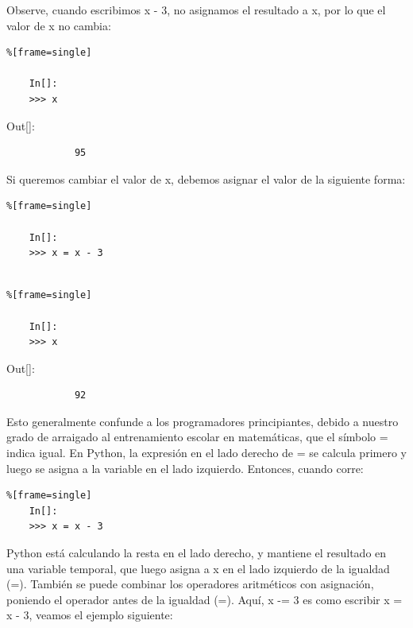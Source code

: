 Observe, cuando escribimos  {\ttfamily x - 3}, no asignamos el resultado a {\ttfamily x}, por lo que el valor de {\ttfamily x} no
cambia:

\begin{lstlisting}%[frame=single]
	
	In[]:	
	>>> x	
\end{lstlisting}

{\ttfamily\scriptsize\scriptsize 
	\hspace{-0.65cm}Out[]:\vspace{-0.15cm}	
	{\color{blue} 	
		\begin{verbatim}
			95
		\end{verbatim}
}}

Si queremos cambiar el valor de {\ttfamily x}, debemos asignar el valor de la siguiente 
forma:

\begin{lstlisting}%[frame=single]
	
	In[]:	
	>>> x = x - 3
	
\end{lstlisting}

\begin{lstlisting}%[frame=single]
	
	In[]:	
	>>> x	
\end{lstlisting}

{\ttfamily\scriptsize\scriptsize 
	\hspace{-0.65cm}Out[]:\vspace{-0.15cm}	
	{\color{blue} 	
		\begin{verbatim}
			92
		\end{verbatim}
}}

Esto generalmente confunde a los programadores principiantes, debido a nuestro grado de arraigado
al entrenamiento escolar en matemáticas,  que el símbolo  {\ttfamily =}  indica  igual. En Python, la expresión
en el lado derecho de {\ttfamily =} se calcula primero y luego se asigna a la variable en el lado izquierdo. Entonces, cuando corre:

\begin{lstlisting}%[frame=single]
	In[]:	
	>>> x = x - 3	
\end{lstlisting}
Python está calculando la resta en el lado derecho, y mantiene el resultado en una variable temporal, que  luego asigna a  {\ttfamily x} en el lado izquierdo de la igualdad ({\ttfamily =}).  También se puede combinar los operadores aritméticos con asignación, poniendo el operador antes  de la igualdad ({\ttfamily =}). Aquí, {\ttfamily  x -= 3} es como escribir {\ttfamily x = x - 3}, veamos el ejemplo siguiente:

